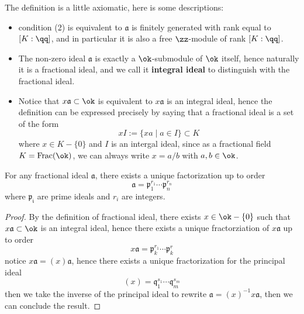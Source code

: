 \begin{remark}
    The definition is a little axiomatic, here is some descriptions:
    \begin{itemize}
        \item condition (2) is equivalent to \(\mathfrak{a}\) is finitely generated with rank equal to \([K:\qq]\), and in particular it is also a free \(\zz\)-module of rank \([K:\qq]\).
        \item  The non-zero ideal \(\mathfrak{a}\) is exactly a \(\ok\)-submodule of \(\ok\) itself, hence naturally it is a fractional ideal, and we call it \textbf{integral ideal} to distinguish with the fractional ideal.
        \item Notice that \(x\mathfrak{a} \subset \ok\) is equivalent to \(x\mathfrak{a}\) is an integral ideal, hence the definition can be expressed precisely by saying that a fractional ideal is a set of the form
        \[xI := \{xa \mid a \in I\} \subset K\] 
        where \(x \in K-\{0\}\) and \(I\) is an intergal ideal, since as a fractional field \(K = \mathrm{Frac}(\ok)\), we can always write \(x = a/b\) with \(a,b \in \ok\).

    \end{itemize}
\end{remark}


\begin{colorlemma}
    For any fractional ideal \(\mathfrak{a}\), there exists a unique factorization up to order \[\mathfrak{a} = \mathfrak{p}_1^{r_1} \cdots \mathfrak{p}_n^{r_n}\]
    where \(\mathfrak{p_i}\) are prime ideals and \(r_i\) are integers.
\end{colorlemma}

\begin{proof}
    By the definition of fractional ideal, there exists \(x \in \ok-\{0\}\) such that \(x\mathfrak{a} \subset \ok\) is an integral ideal, hence there exists a unique fractorziation of \(x\mathfrak{a}\) up to order
    \[x\mathfrak{a} = \mathfrak{p}_k^{r_1} \cdots \mathfrak{p}_k^{r}\]
    notice \(x\mathfrak{a} = (x) \mathfrak{a}\), hence there exists a unique fractorization for the principal ideal
    \[(x) = \mathfrak{q}_1^{s_1} \cdots \mathfrak{q}_m^{s_m}\]
    then we take the inverse of the principal ideal to rewrite \(\mathfrak{a} = (x)^{-1} x\mathfrak{a}\), then we can conclude the result.
\end{proof}

